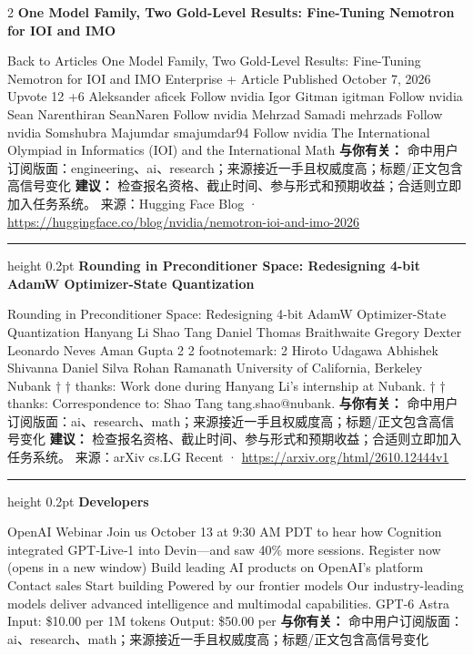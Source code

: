 \documentclass[10.5pt]{ctexart}
\begin{document}
\begin{multicols}{2}
{\large\bfseries One Model Family, Two Gold-Level Results: Fine-Tuning Nemotron for IOI and IMO}\par
Back to Articles One Model Family, Two Gold-Level Results: Fine-Tuning Nemotron for IOI and IMO Enterprise + Article Published October 7, 2026 Upvote 12 +6 Aleksander aficek Follow nvidia Igor Gitman igitman Follow nvidia Sean Narenthiran SeanNaren Follow nvidia Mehrzad Samadi mehrzads Follow nvidia Somshubra Majumdar smajumdar94 Follow nvidia The International Olympiad in Informatics (IOI) and the International Math
\textbf{与你有关：} 命中用户订阅版面：engineering、ai、research；来源接近一手且权威度高；标题/正文包含高信号变化
\textbf{建议：} 检查报名资格、截止时间、参与形式和预期收益；合适则立即加入任务系统。
{\footnotesize\color{ormuted} 来源：Hugging Face Blog · \url{https://huggingface.co/blog/nvidia/nemotron-ioi-and-imo-2026}}
\vspace{2mm}
\hrule height 0.2pt
\vspace{2mm}
{\large\bfseries Rounding in Preconditioner Space: Redesigning 4-bit AdamW Optimizer-State Quantization}\par
Rounding in Preconditioner Space: Redesigning 4-bit AdamW Optimizer-State Quantization Hanyang Li Shao Tang Daniel Thomas Braithwaite Gregory Dexter Leonardo Neves Aman Gupta 2 2 footnotemark: 2 Hiroto Udagawa Abhishek Shivanna Daniel Silva Rohan Ramanath University of California, Berkeley Nubank † † thanks: Work done during Hanyang Li’s internship at Nubank. † † thanks: Correspondence to: Shao Tang tang.shao@nubank.
\textbf{与你有关：} 命中用户订阅版面：ai、research、math；来源接近一手且权威度高；标题/正文包含高信号变化
\textbf{建议：} 检查报名资格、截止时间、参与形式和预期收益；合适则立即加入任务系统。
{\footnotesize\color{ormuted} 来源：arXiv cs.LG Recent · \url{https://arxiv.org/html/2610.12444v1}}
\vspace{2mm}
\hrule height 0.2pt
\vspace{2mm}
{\large\bfseries Developers}\par
OpenAI Webinar Join us October 13 at 9:30 AM PDT to hear how Cognition integrated GPT‑Live‑1 into Devin—and saw 40\% more sessions. Register now (opens in a new window) Build leading AI products on OpenAI’s platform Contact sales Start building Powered by our frontier models Our industry-leading models deliver advanced intelligence and multimodal capabilities. GPT-6 Astra Input: \$10.00 per 1M tokens Output: \$50.00 per
\textbf{与你有关：} 命中用户订阅版面：ai、research、math；来源接近一手且权威度高；标题/正文包含高信号变化

\end{multicols}
\end{document}
